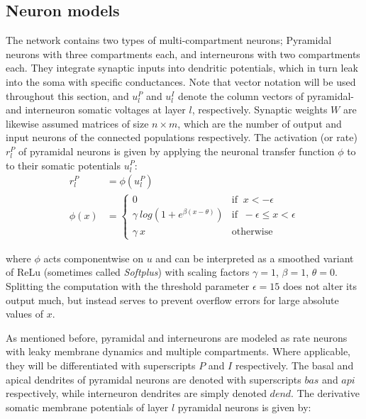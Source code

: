 \subsection{Neuron models}\label{sec-neurons}



The network contains two types of multi-compartment neurons; Pyramidal neurons with three compartments each, and
interneurons with two compartments each. They integrate synaptic inputs into dendritic potentials, which in turn leak
into the soma with specific conductances. Note that vector notation will be used throughout this section, and $u_l^P$
and $u_l^I$ denote the column vectors of pyramidal- and interneuron somatic voltages at layer $l$, respectively.
Synaptic weights $W$ are likewise assumed matrices of size $n \times m$, which are the number of output and input
neurons of the connected populations respectively. The activation (or rate) $r_l^P$ of pyramidal neurons is given by
applying the neuronal transfer function $\phi$ to to their somatic potentials $u_l^P$:
\begin{align}
  r_l^P   & = \phi(u_l^P)                                                                      \\
  \phi(x) & = \begin{cases}
                0                                   & \textrm{if } \ x < -\epsilon               \\
                \gamma \ log(1+e^{\beta(x-\theta)}) & \textrm{if } \ -\epsilon \leq x < \epsilon \\
                \gamma \ x                          & \textrm{otherwise}
              \end{cases}
\end{align}

where $\phi$ acts componentwise on $u$ and can be interpreted as a smoothed variant of ReLu (sometimes called
\textit{Softplus}) with scaling factors $\gamma=1$, $\beta=1$, $\theta=0$. Splitting the computation with the threshold
parameter $\epsilon=15$ does not alter its output much, but instead serves to prevent overflow errors for large absolute
values of $x$.

As mentioned before, pyramidal and interneurons are modeled as rate neurons with leaky membrane dynamics and multiple
compartments. Where applicable, they will be differentiated with superscripts $P$ and $I$ respectively. The basal and
apical dendrites of pyramidal neurons are denoted with superscripts $bas$ and $api$ respectively, while interneuron
dendrites are simply denoted $dend$.  The derivative somatic membrane potentials of layer $l$ pyramidal neurons is given
by:

